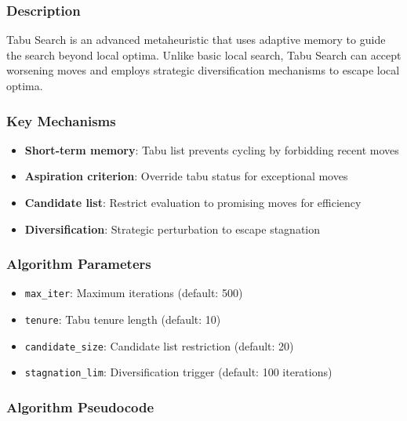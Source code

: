 \documentclass[11pt,a4paper]{article}
\begin{document}
\subsubsection{Description}

Tabu Search \cite{glover1997} is an advanced metaheuristic that uses adaptive memory to guide the search beyond local optima. Unlike basic local search, Tabu Search can accept worsening moves and employs strategic diversification mechanisms to escape local optima.

\subsubsection{Key Mechanisms}
\begin{itemize}
  \item \textbf{Short-term memory}: Tabu list prevents cycling by forbidding recent moves
  \item \textbf{Aspiration criterion}: Override tabu status for exceptional moves
  \item \textbf{Candidate list}: Restrict evaluation to promising moves for efficiency
  \item \textbf{Diversification}: Strategic perturbation to escape stagnation
\end{itemize}

\subsubsection{Algorithm Parameters}
\begin{itemize}
  \item \texttt{max\_iter}: Maximum iterations (default: 500)
  \item \texttt{tenure}: Tabu tenure length (default: 10)
  \item \texttt{candidate\_size}: Candidate list restriction (default: 20)
  \item \texttt{stagnation\_lim}: Diversification trigger (default: 100 iterations)
\end{itemize}
\subsubsection{Algorithm Pseudocode}
\end{document}
